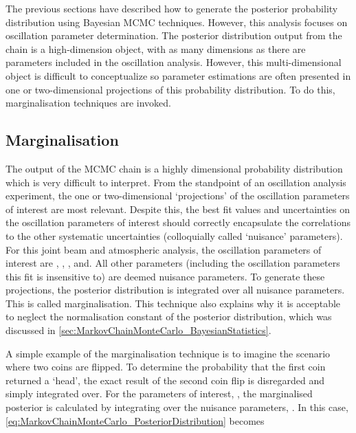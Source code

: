 The previous sections have described how to generate the posterior probability distribution using Bayesian MCMC techniques. However, this analysis focuses on oscillation parameter determination. The posterior distribution output from the chain is a high-dimension object, with as many dimensions as there are parameters included in the oscillation analysis. However, this multi-dimensional object is difficult to conceptualize so parameter estimations are often presented in one or two-dimensional projections of this probability distribution. To do this, marginalisation techniques are invoked.

\subsection{Marginalisation}
\label{sec:MarkovChainMonteCarlo_Marginalisation}

The output of the MCMC chain is a highly dimensional probability distribution which is very difficult to interpret. From the standpoint of an oscillation analysis experiment, the one or two-dimensional `projections' of the oscillation parameters of interest are most relevant. Despite this, the best fit values and uncertainties on the oscillation parameters of interest should correctly encapsulate the correlations to the other systematic uncertainties (colloquially called `nuisance' parameters). For this joint beam and atmospheric analysis, the oscillation parameters of interest are , , , and. All other parameters (including the oscillation parameters this fit is insensitive to) are deemed nuisance parameters. To generate these projections, the posterior distribution is integrated over all nuisance parameters. This is called marginalisation. This technique also explains why it is acceptable to neglect the normalisation constant of the posterior distribution, which was discussed in \autoref{sec:MarkovChainMonteCarlo_BayesianStatistics}.

A simple example of the marginalisation technique is to imagine the scenario where two coins are flipped. To determine the probability that the first coin returned a `head', the exact result of the second coin flip is disregarded and simply integrated over. For the parameters of interest, , the marginalised posterior is calculated by integrating over the nuisance parameters, . In this case, \autoref{eq:MarkovChainMonteCarlo_PosteriorDistribution} becomes

